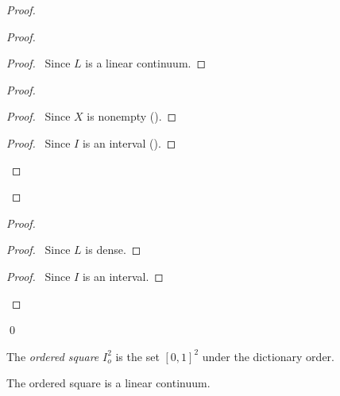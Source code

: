 \begin{proof}
    \pf
    \begin{proof}
        \begin{proof}
            \pf\ Since $L$ is a linear continuum.
        \end{proof}
        \begin{proof}
            \begin{proof}
                \pf\ Since $X$ is nonempty ().
            \end{proof}
            \begin{proof}
                \pf\ Since $I$ is an interval ().
            \end{proof}
        \end{proof}
    \end{proof}
    \begin{proof}
        \begin{proof}
            \pf\ Since $L$ is dense.
        \end{proof}
        \begin{proof}
            \pf\ Since $I$ is an interval.
        \end{proof}
    \end{proof}
    \qed
\end{proof}

\begin{definition}
    The \emph{ordered square} $I_o^2$ is the set $[0,1]^2$ under the dictionary order.
\end{definition}

\begin{proposition}
    The ordered square is a linear continuum.
\end{proposition}

